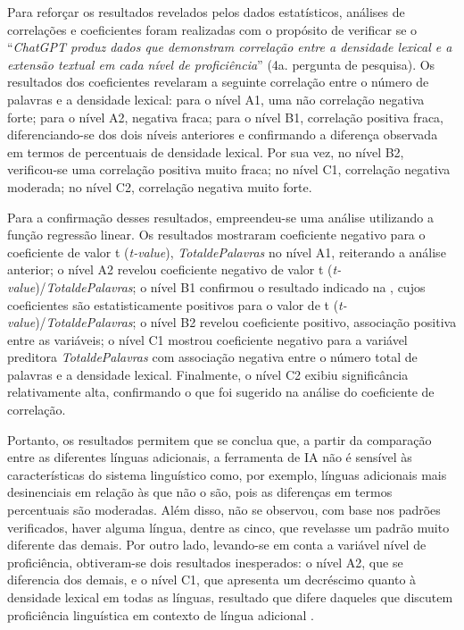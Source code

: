 \documentclass[portuguese]{textolivre}
\begin{document}
Para reforçar os resultados revelados pelos dados estatísticos, análises de correlações e coeficientes foram realizadas com o propósito de verificar se o “\textit{ChatGPT produz dados que demonstram correlação entre a densidade lexical e a extensão textual em cada nível de proficiência}” (4a. pergunta de pesquisa). Os resultados dos coeficientes revelaram a seguinte correlação entre o número de palavras e a densidade lexical: para o nível A1, uma não correlação negativa forte; para o nível A2, negativa fraca; para o nível B1, correlação positiva fraca, diferenciando-se dos dois níveis anteriores e confirmando a diferença observada em termos de percentuais de densidade lexical. Por sua vez, no nível B2, verificou-se uma correlação positiva muito fraca; no nível C1, correlação negativa moderada; no nível C2, correlação negativa muito forte. 

Para a confirmação desses resultados, empreendeu-se uma análise utilizando a função regressão linear. Os resultados mostraram coeficiente negativo para o coeficiente de valor t (\textit{t-value}), \textit{TotaldePalavras} no nível A1, reiterando a análise anterior; o nível A2 revelou coeficiente negativo de valor t (\textit{t-value})/\textit{TotaldePalavras}; o nível B1 confirmou o resultado indicado na , cujos coeficientes são estatisticamente positivos para o valor de t (\textit{t-value})/\textit{TotaldePalavras}; o nível B2 revelou coeficiente positivo, associação positiva entre as variáveis; o nível C1 mostrou coeficiente negativo para a variável preditora \textit{TotaldePalavras} com associação negativa entre o número total de palavras e a densidade lexical. Finalmente, o nível C2 exibiu significância relativamente alta, confirmando o que foi sugerido na análise do coeficiente de correlação.

Portanto, os resultados permitem que se conclua que, a partir da comparação entre as diferentes línguas adicionais, a ferramenta de IA não é sensível às características do sistema linguístico como, por exemplo, línguas adicionais mais desinenciais em relação às que não o são, pois as diferenças em termos percentuais são moderadas. Além disso, não se observou, com base nos padrões verificados, haver alguma língua, dentre as cinco, que revelasse um padrão muito diferente das demais. Por outro lado, levando-se em conta a variável nível de proficiência, obtiveram-se dois resultados inesperados: o nível A2, que se diferencia dos demais, e o nível C1, que apresenta um decréscimo quanto à densidade lexical em todas as línguas, resultado que difere daqueles que discutem proficiência linguística em contexto de língua adicional \cite{kondal_effects_2015,schnur_lexical_2021}.
\end{document}
